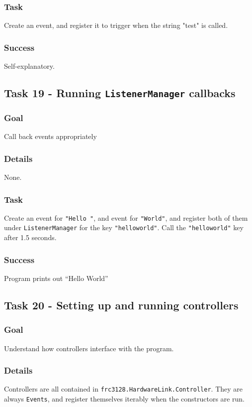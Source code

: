 \documentclass[a4paper]{article}
\begin{document}
\subsubsection{Task} Create an event, and register it to trigger when the string "test" is called.
\subsubsection{Success} Self-explanatory.

\subsection{Task 19 - Running \lstinline{ListenerManager} callbacks}
\subsubsection{Goal} Call back events appropriately
\subsubsection{Details} None.
\subsubsection{Task} Create an event for \lstinline{"Hello "}, and event for \lstinline{"World"}, and register both of them under \lstinline{ListenerManager} for the key \lstinline{"helloworld"}. Call the \lstinline{"helloworld"} key after 1.5 seconds.
\subsubsection{Success} Program prints out ``Hello World''

\subsection{Task 20 - Setting up and running controllers}
\subsubsection{Goal} Understand how controllers interface with the program.
\subsubsection{Details} Controllers are all contained in \lstinline{frc3128.HardwareLink.Controller}. They are always \lstinline{Events}, and register themselves iterably when the constructors are run. 
\end{document}

